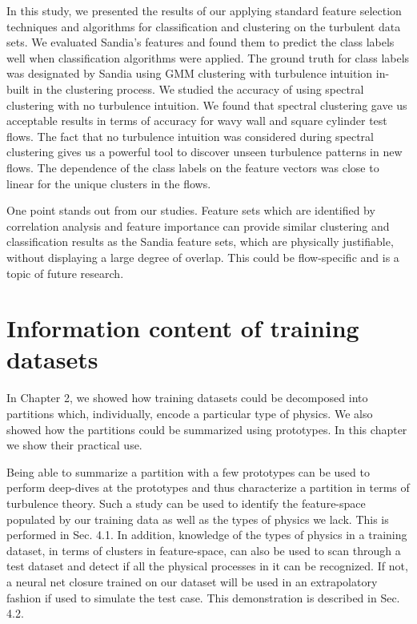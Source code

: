 In this study, we presented the results of our applying standard feature selection techniques and algorithms for classiﬁcation and clustering on the turbulent data sets. We evaluated Sandia’s features and found them to predict the class labels well when classiﬁcation algorithms were applied. The ground truth for class labels was designated by Sandia using GMM clustering with turbulence intuition in-built in the clustering process. We studied the accuracy of using spectral clustering with no turbulence intuition. We found that spectral clustering gave us acceptable results in terms of accuracy for wavy wall and square cylinder test ﬂows. The fact that no turbulence intuition was considered during spectral clustering gives us a powerful tool to discover unseen turbulence patterns in new ﬂows. The dependence of the class labels on the feature vectors was close to linear for the unique clusters in the ﬂows.

One point stands out from our studies. Feature sets which are identiﬁed by correlation analysis and feature importance can provide similar clustering and classiﬁcation results as the Sandia feature sets, which are physically justiﬁable, without displaying a large degree of overlap. This could be ﬂow-speciﬁc and is a topic of future research.


\section{Information content of training datasets}

In Chapter 2, we showed how training datasets could be decomposed into partitions which, individually,
encode a particular type of physics. We also showed how the partitions could be summarized using
prototypes. In this chapter we show their practical use.

Being able to summarize a partition with a few prototypes can be used to perform deep-dives at the
prototypes and thus characterize a partition in terms of turbulence theory. Such a study can be used to
identify the feature-space populated by our training data as well as the types of physics we lack. This is performed in Sec. 4.1. In addition, knowledge of the types of physics in a training dataset, in terms of clusters in feature-space, can also be used to scan through a test dataset and detect if all the physical processes in it can be recognized. If not, a neural net closure trained on our dataset will be used in an extrapolatory fashion if used to simulate the test case. This demonstration is described in Sec. 4.2.

